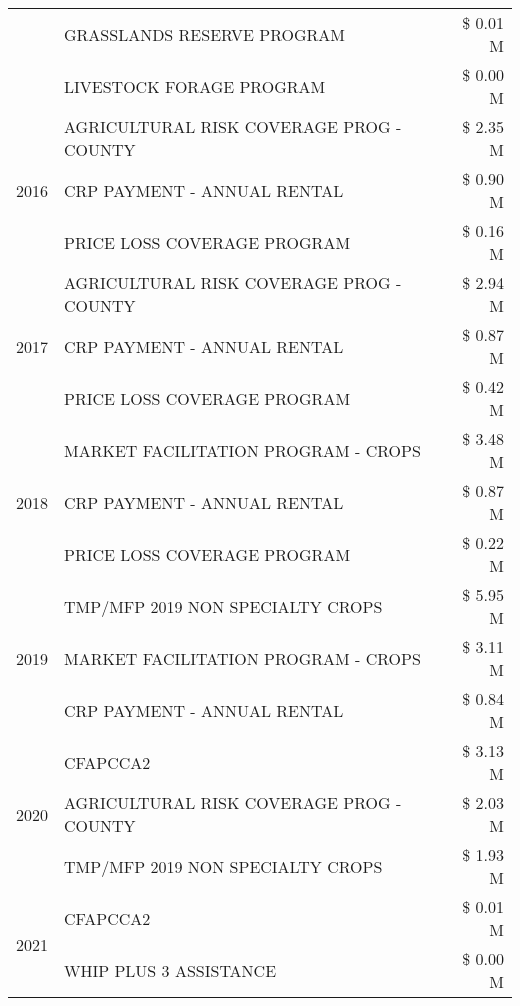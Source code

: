 \begin{tabular}{llr}
 & GRASSLANDS RESERVE PROGRAM & \$ 0.01 M \\
 & LIVESTOCK FORAGE PROGRAM & \$ 0.00 M \\
\cline{1-3}
\multirow[t]{3}{*}{2016} & AGRICULTURAL RISK COVERAGE PROG - COUNTY      & \$ 2.35 M \\
 & CRP PAYMENT - ANNUAL RENTAL                   & \$ 0.90 M \\
 & PRICE LOSS COVERAGE PROGRAM                   & \$ 0.16 M \\
\cline{1-3}
\multirow[t]{3}{*}{2017} & AGRICULTURAL RISK COVERAGE PROG - COUNTY & \$ 2.94 M \\
 & CRP PAYMENT - ANNUAL RENTAL & \$ 0.87 M \\
 & PRICE LOSS COVERAGE PROGRAM & \$ 0.42 M \\
\cline{1-3}
\multirow[t]{3}{*}{2018} & MARKET FACILITATION PROGRAM - CROPS & \$ 3.48 M \\
 & CRP PAYMENT - ANNUAL RENTAL & \$ 0.87 M \\
 & PRICE LOSS COVERAGE PROGRAM & \$ 0.22 M \\
\cline{1-3}
\multirow[t]{3}{*}{2019} & TMP/MFP 2019 NON SPECIALTY CROPS & \$ 5.95 M \\
 & MARKET FACILITATION PROGRAM - CROPS & \$ 3.11 M \\
 & CRP PAYMENT - ANNUAL RENTAL & \$ 0.84 M \\
\cline{1-3}
\multirow[t]{3}{*}{2020} & CFAPCCA2 & \$ 3.13 M \\
 & AGRICULTURAL RISK COVERAGE PROG - COUNTY & \$ 2.03 M \\
 & TMP/MFP 2019 NON SPECIALTY CROPS & \$ 1.93 M \\
\cline{1-3}
\multirow[t]{2}{*}{2021} & CFAPCCA2 & \$ 0.01 M \\
 & WHIP PLUS 3 ASSISTANCE & \$ 0.00 M \\
\cline{1-3}
\bottomrule
\end{tabular}

